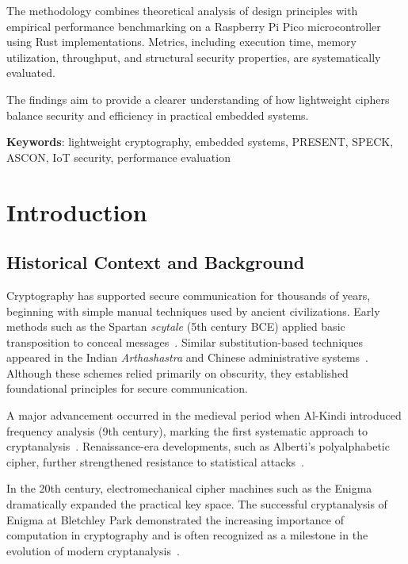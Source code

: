 \documentclass[12pt]{report}
\begin{document}
The methodology combines theoretical analysis of design principles with empirical
performance benchmarking on a Raspberry Pi Pico microcontroller using Rust
implementations. Metrics, including execution time, memory utilization, throughput,
and structural security properties, are systematically evaluated.

The findings aim to provide a clearer understanding of how lightweight ciphers balance
security and efficiency in practical embedded systems.

\vspace{1cm}
\noindent \textbf{Keywords}: lightweight cryptography, embedded systems, PRESENT, SPECK,
ASCON, IoT security, performance evaluation

\newpage
\tableofcontents

\newpage
\chapter{Introduction}

\section{Historical Context and Background}

Cryptography has supported secure communication for thousands of years, beginning with
simple manual techniques used by ancient civilizations. Early methods such as the Spartan
\textit{scytale} (5th century BCE) applied basic transposition to conceal messages~\cite{singh2000codebook}.
Similar substitution-based techniques appeared in the Indian \textit{Arthashastra} and Chinese
administrative systems~\cite{singh2000codebook}. Although these schemes relied primarily on
obscurity, they established foundational principles for secure communication.

A major advancement occurred in the medieval period when Al-Kindi introduced frequency analysis
(9th century), marking the first systematic approach to cryptanalysis~\cite{alkindi1987manuscript}.
Renaissance-era developments, such as Alberti's polyalphabetic cipher, further strengthened
resistance to statistical attacks~\cite{singh2000codebook}.

In the 20th century, electromechanical cipher machines such as the Enigma dramatically expanded
the practical key space. The successful cryptanalysis of Enigma at Bletchley Park demonstrated
the increasing importance of computation in cryptography and is often recognized as a milestone
in the evolution of modern cryptanalysis~\cite{hodges2014turing}.
\end{document}
